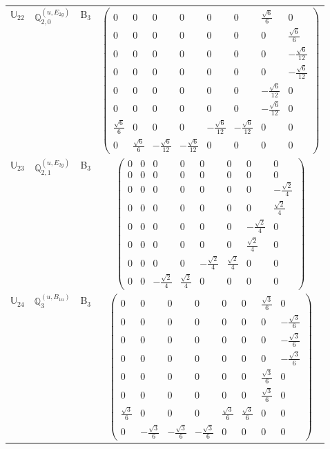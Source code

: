 \documentclass[fleqn,10pt,landscape]{article}
\begin{document}
\begin{itemize}
\begin{center}
\begin{longtable}{c|c|c|c}
$ \mathbb{U}_{22} $ & $\mathbb{Q}_{2,0}^{(u,E_{2g})}$ & B$_{3}$ & $\begin{pmatrix} 0 & 0 & 0 & 0 & 0 & 0 & \frac{\sqrt{6}}{6} & 0 \\ 0 & 0 & 0 & 0 & 0 & 0 & 0 & \frac{\sqrt{6}}{6} \\ 0 & 0 & 0 & 0 & 0 & 0 & 0 & - \frac{\sqrt{6}}{12} \\ 0 & 0 & 0 & 0 & 0 & 0 & 0 & - \frac{\sqrt{6}}{12} \\ 0 & 0 & 0 & 0 & 0 & 0 & - \frac{\sqrt{6}}{12} & 0 \\ 0 & 0 & 0 & 0 & 0 & 0 & - \frac{\sqrt{6}}{12} & 0 \\ \frac{\sqrt{6}}{6} & 0 & 0 & 0 & - \frac{\sqrt{6}}{12} & - \frac{\sqrt{6}}{12} & 0 & 0 \\ 0 & \frac{\sqrt{6}}{6} & - \frac{\sqrt{6}}{12} & - \frac{\sqrt{6}}{12} & 0 & 0 & 0 & 0 \end{pmatrix}$ \\
$ \mathbb{U}_{23} $ & $\mathbb{Q}_{2,1}^{(u,E_{2g})}$ & B$_{3}$ & $\begin{pmatrix} 0 & 0 & 0 & 0 & 0 & 0 & 0 & 0 \\ 0 & 0 & 0 & 0 & 0 & 0 & 0 & 0 \\ 0 & 0 & 0 & 0 & 0 & 0 & 0 & - \frac{\sqrt{2}}{4} \\ 0 & 0 & 0 & 0 & 0 & 0 & 0 & \frac{\sqrt{2}}{4} \\ 0 & 0 & 0 & 0 & 0 & 0 & - \frac{\sqrt{2}}{4} & 0 \\ 0 & 0 & 0 & 0 & 0 & 0 & \frac{\sqrt{2}}{4} & 0 \\ 0 & 0 & 0 & 0 & - \frac{\sqrt{2}}{4} & \frac{\sqrt{2}}{4} & 0 & 0 \\ 0 & 0 & - \frac{\sqrt{2}}{4} & \frac{\sqrt{2}}{4} & 0 & 0 & 0 & 0 \end{pmatrix}$ \\
$ \mathbb{U}_{24} $ & $\mathbb{Q}_{3}^{(u,B_{1u})}$ & B$_{3}$ & $\begin{pmatrix} 0 & 0 & 0 & 0 & 0 & 0 & \frac{\sqrt{3}}{6} & 0 \\ 0 & 0 & 0 & 0 & 0 & 0 & 0 & - \frac{\sqrt{3}}{6} \\ 0 & 0 & 0 & 0 & 0 & 0 & 0 & - \frac{\sqrt{3}}{6} \\ 0 & 0 & 0 & 0 & 0 & 0 & 0 & - \frac{\sqrt{3}}{6} \\ 0 & 0 & 0 & 0 & 0 & 0 & \frac{\sqrt{3}}{6} & 0 \\ 0 & 0 & 0 & 0 & 0 & 0 & \frac{\sqrt{3}}{6} & 0 \\ \frac{\sqrt{3}}{6} & 0 & 0 & 0 & \frac{\sqrt{3}}{6} & \frac{\sqrt{3}}{6} & 0 & 0 \\ 0 & - \frac{\sqrt{3}}{6} & - \frac{\sqrt{3}}{6} & - \frac{\sqrt{3}}{6} & 0 & 0 & 0 & 0 \end{pmatrix}$ \\

\end{longtable}
\end{center}
\end{itemize}
\end{document}
